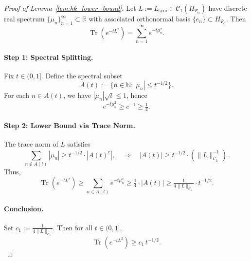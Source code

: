 \begin{proof}[Proof of Lemma~\ref{lem:hk_lower_bound}]
Let \( L := L_{\mathrm{sym}} \in \mathcal{C}_1(H_{\Psi_\alpha}) \) have discrete real spectrum \( \{ \mu_n \}_{n=1}^\infty \subset \mathbb{R} \) with associated orthonormal basis \( \{ e_n \} \subset H_{\Psi_\alpha} \). Then
\[
\operatorname{Tr}(e^{-t L^2}) = \sum_{n=1}^\infty e^{-t \mu_n^2}.
\]

\paragraph{Step 1: Spectral Splitting.}
Fix \( t \in (0,1] \). Define the spectral subset
\[
A(t) := \{ n \in \mathbb{N} : |\mu_n| \le t^{-1/2} \}.
\]
For each \( n \in A(t) \), we have \( |\mu_n| \sqrt{t} \le 1 \), hence
\[
e^{-t \mu_n^2} \ge e^{-1} \ge \tfrac{1}{4}.
\]

\paragraph{Step 2: Lower Bound via Trace Norm.}
The trace norm of \( L \) satisfies
\[
\sum_{n \notin A(t)} |\mu_n| \ge t^{-1/2} \cdot |A(t)^c|,
\quad \Rightarrow \quad |A(t)| \ge t^{-1/2} \cdot \left( \|L\|_{\mathcal{C}_1}^{-1} \right).
\]
Thus,
\[
\operatorname{Tr}(e^{-t L^2}) \ge \sum_{n \in A(t)} e^{-t \mu_n^2}
\ge \tfrac{1}{4} \cdot |A(t)| \ge \tfrac{1}{4 \|L\|_{\mathcal{C}_1}} \cdot t^{-1/2}.
\]

\paragraph{Conclusion.}
Set \( c_1 := \tfrac{1}{4 \|L\|_{\mathcal{C}_1}} \). Then for all \( t \in (0,1] \),
\[
\operatorname{Tr}(e^{-t L^2}) \ge c_1 \, t^{-1/2}.
\]
\end{proof}
